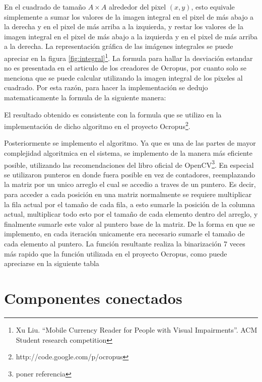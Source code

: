 \documentclass[a4paper, 11pt, oneside]{report}
\begin{document}
En el cuadrado de tamaño $A \times A$ alrededor del pixel $(x, y)$, esto equivale simplemente a sumar los valores de la imagen integral en el pixel de más abajo a la derecha y en el pixel de más arriba a la izquierda, y restar los valores de la imagen integral en el pixel de más abajo a la izquierda y en el pixel de más arriba a la derecha. La representación gráfica de las imágenes integrales se puede apreciar en la figura \ref{fig:integral}\footnote{Xu Liu. ``Mobile Currency Reader for People with Visual Impairments''. ACM Student research competition}. La formula para hallar la desviación estandar no es presentada en el articulo de los creadores de Ocropus, por cuanto solo se menciona que se puede calcular utilizando la imagen integral de los pixeles al cuadrado. Por esta razón, para hacer la implementación se dedujo matematicamente la formula de la siguiente manera:


El resultado obtenido es consistente con la formula que se utilizo en la implementación de dicho algoritmo en el proyecto Ocropus\footnote{http://code.google.com/p/ocropus}.

Posteriormente se implemento el algoritmo. Ya que es una de las partes de mayor complejidad algoritmica en el sistema, se implemento de la manera más eficiente posible, utilizando las recomendaciones del libro oficial de OpenCV\footnote{poner referencia}. En especial se utilizaron punteros en donde fuera posible en vez de contadores, reemplazando la matriz por un unico arreglo el cual se accedio a traves de un puntero. Es decir, para acceder a cada posición en una matriz normalmente se requiere multiplicar la fila actual por el tamaño de cada fila, a esto sumarle la posición de la columna actual, multiplicar todo esto por el tamaño de cada elemento dentro del arreglo, y finalmente sumarle este valor al puntero base de la matriz. De la forma en que se implemento, en cada iteración unicamente era necesario sumarle el tamaño de cada elemento al puntero. La función resultante realiza la binarización 7 veces más rapido que la función utilizada en el proyecto Ocropus, como puede apreciarse en la siguiente tabla %


\section{Componentes conectados}
\end{document}

